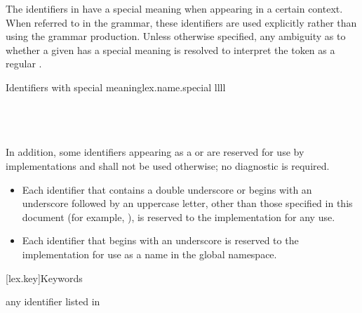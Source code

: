 \pnum
{}%
%
%
%
The identifiers in  have a special meaning when
appearing in a certain context. When referred to in the grammar, these identifiers
are used explicitly rather than using the  grammar production.
Unless otherwise specified, any ambiguity as to whether a given
 has a special meaning is resolved to interpret the
token as a regular .

\begin{multicolfloattable}{Identifiers with special meaning}{lex.name.special}
{llll}
           \\
\columnbreak
{}          \\
\columnbreak
{}          \\
\columnbreak
{}        \\
\end{multicolfloattable}

\pnum
{}%
%
%
In addition, some identifiers
appearing as a  or 
are reserved for use by \Cpp{}
implementations and shall
not be used otherwise; no diagnostic is required.
\begin{itemize}
\item
Each identifier that contains a double underscore
\tcode{\unun}
%
or begins with an underscore followed by
an uppercase letter,
other than those specified in this document
(for example, ),
%
is reserved to the implementation for any use.
\item
Each identifier that begins with an underscore is
%
reserved to the implementation for use as a name in the global namespace.%
\end{itemize}%

[lex.key]{Keywords}

\begin{bnf}
\br
    \textnormal{any identifier listed in }\br
    \br
    \br
\end{bnf}

